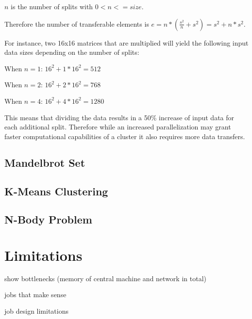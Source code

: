 $n$ is the number of splits with $0 < n <= size$.

Therefore the number of transferable elements is
$e = n*(\frac{s^2}{n}+s^2) = s^2 + n*s^2$.

For instance, two 16x16 matrices that are multiplied will yield the following input data sizes depending on the number of splits:

When $n=1$: $16^2+1*16^2 = 512$

When $n=2$: $16^2+2*16^2 = 768$

When $n=4$: $16^2 + 4*16^2 = 1280$

This means that dividing the data results in a 50\% increase of input data for each additional split. Therefore while an increased parallelization may grant faster computational capabilities of a cluster it also requires more data transfers.

\subsection*{Mandelbrot Set}



\subsection*{K-Means Clustering}

\subsection*{N-Body Problem}

\section{Limitations}

show bottlenecks (memory of central machine and network in total)

jobs that make sense

job design limitations